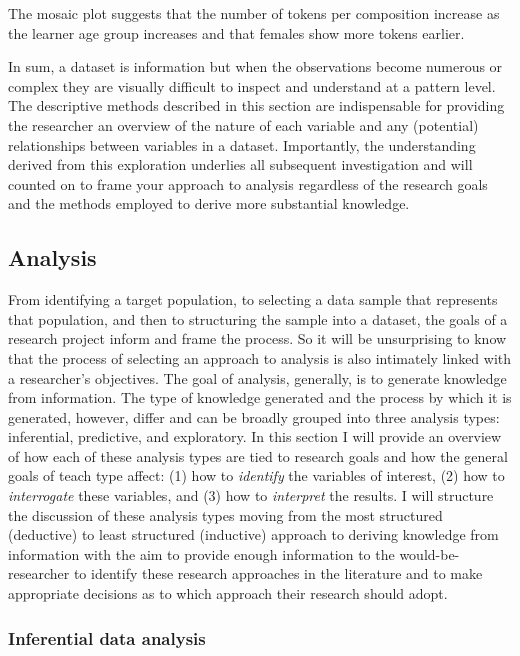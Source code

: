 \documentclass[
]{article}
\begin{document}
The mosaic plot suggests that the number of tokens per composition increase as the learner age group increases and that females show more tokens earlier.

In sum, a dataset is information but when the observations become numerous or complex they are visually difficult to inspect and understand at a pattern level. The descriptive methods described in this section are indispensable for providing the researcher an overview of the nature of each variable and any (potential) relationships between variables in a dataset. Importantly, the understanding derived from this exploration underlies all subsequent investigation and will counted on to frame your approach to analysis regardless of the research goals and the methods employed to derive more substantial knowledge.

\hypertarget{analysis}{%
\subsection{Analysis}\label{analysis}}

From identifying a target population, to selecting a data sample that represents that population, and then to structuring the sample into a dataset, the goals of a research project inform and frame the process. So it will be unsurprising to know that the process of selecting an approach to analysis is also intimately linked with a researcher's objectives. The goal of analysis, generally, is to generate knowledge from information. The type of knowledge generated and the process by which it is generated, however, differ and can be broadly grouped into three analysis types: inferential, predictive, and exploratory. In this section I will provide an overview of how each of these analysis types are tied to research goals and how the general goals of teach type affect: (1) how to \emph{identify} the variables of interest, (2) how to \emph{interrogate} these variables, and (3) how to \emph{interpret} the results. I will structure the discussion of these analysis types moving from the most structured (deductive) to least structured (inductive) approach to deriving knowledge from information with the aim to provide enough information to the would-be-researcher to identify these research approaches in the literature and to make appropriate decisions as to which approach their research should adopt.

\hypertarget{inferential-data-analysis}{%
\subsubsection{Inferential data analysis}\label{inferential-data-analysis}}
\end{document}
